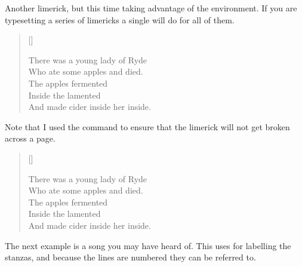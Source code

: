 Another limerick, but this time taking advantage of 
the 
environment. If you are typesetting a series of limericks 
a single \cmd{\indentpattern} will do for all of them.
\begin{lcode}
\settowidth{\versewidth}{There was a young lady of Ryde}
\needspace{7\onelineskip}
\begin{verse}[\versewidth]
\begin{patverse}
There was a young lady of Ryde \\
Who ate some apples and died. \\
The apples fermented \\
Inside the lamented \\
And made cider inside her inside.
\end{patverse}
\end{verse}
\end{lcode}
Note that I used the \cmd{\needspace} command to ensure that 
the limerick will not get broken across a page.

\settowidth{\versewidth}{There was a young lady of Ryde}
\needspace{7\onelineskip}
\begin{verse}[\versewidth]
\begin{patverse}
There was a young lady of Ryde \\
Who ate some apples and died. \\
The apples fermented \\
Inside the lamented \\
And made cider inside her inside.
\end{patverse}
\end{verse}

\vspace{\onelineskip}


    The next example is a song you may have heard of. This uses 
\cmd{\flagverse} for labelling the stanzas, 
and because the lines are numbered they can be referred to. 

